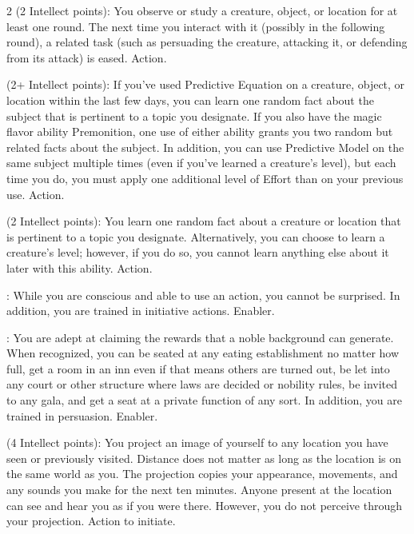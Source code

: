 \begin{multicols}{2}
 (2 Intellect points): You observe or study a creature, object, or location for at least one round. The next time you interact with it (possibly in the following round), a related task (such as persuading the creature, attacking it, or defending from its attack) is eased. Action. 
 
 (2+ Intellect points): If you’ve used Predictive Equation on a creature, object, or location within the last few days, you can learn one random fact about the subject that is pertinent to a topic you designate. If you also have the magic flavor ability Premonition, one use of either ability grants you two random but related facts about the subject. In addition, you can use Predictive Model on the same subject multiple times (even if you’ve learned a creature’s level), but each time you do, you must apply one additional level of Effort than on your previous use. Action. 
 
 (2 Intellect points): You learn one random fact about a creature or location that is pertinent to a topic you designate. Alternatively, you can choose to learn a creature’s level; however, if you do so, you cannot learn anything else about it later with this ability. Action. 
 
: While you are conscious and able to use an action, you cannot be surprised. In addition, you are trained in initiative actions. Enabler. 
 
: You are adept at claiming the rewards that a noble background can generate. When recognized, you can be seated at any eating establishment no matter how full, get a room in an inn even if that means others are turned out, be let into any court or other structure where laws are decided or nobility rules, be invited to any gala, and get a seat at a private function of any sort. In addition, you are trained in persuasion. Enabler.
 
 (4 Intellect points): You project an image of yourself to any location you have seen or previously visited. Distance does not matter as long as the location is on the same world as you. The projection copies your appearance, movements, and any sounds you make for the next ten minutes. Anyone present at the location can see and hear you as if you were there. However, you do not perceive through your projection. Action to initiate. 
 

\end{multicols}
